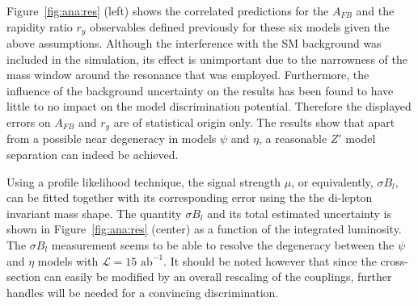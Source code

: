 \documentclass[a4paper,11pt]{article}
\newcommand*{\intlumihelhc}{\ensuremath{\mathcal{L}=15\text{ ab}^{-1}}}
\begin{document}
Figure~\ref{fig:ana:res} (left) shows the correlated predictions for the $A_{FB}$ and the rapidity ratio $r_y$ observables defined previously for these six models given the above assumptions. Although the interference with the SM background was included in the simulation, its effect is unimportant due to the narrowness of the mass window around the resonance that was employed. Furthermore, the influence of the background uncertainty on the results has been found to have little to no impact on the model discrimination potential. Therefore the displayed errors on $A_{FB}$ and $r_y$ are of statistical origin only. The results show that apart from a possible near degeneracy in models $\psi$ and $\eta$, a reasonable $Z'$ model separation can indeed be achieved.

Using a profile likelihood technique, the signal strength $\mu$, or equivalently, $\sigma B_l$, can be fitted together with its corresponding error using the the di-lepton invariant mass shape. The quantity $\sigma B_l$ and its total estimated uncertainty is shown in Figure~\ref{fig:ana:res} (center) as a function of the integrated luminosity. The $\sigma B_l$ measurement seems to be able to resolve the degeneracy between the $\psi$ and $\eta$ models with \intlumihelhc. It should be noted however that since the cross-section can easily be modified by an overall rescaling of the couplings, further handles will be needed for a convincing discrimination.
\end{document}
